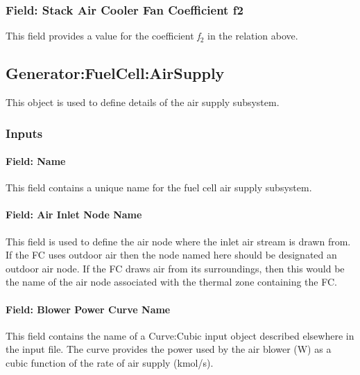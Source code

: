 \subsubsection{Field: Stack Air Cooler Fan Coefficient f2}\label{field-stack-air-cooler-fan-coefficient-f2}

This field provides a value for the coefficient \emph{f\(_{2}\)} in the relation above.

\subsection{Generator:FuelCell:AirSupply}\label{generatorfuelcellairsupply}

This object is used to define details of the air supply subsystem.

\subsubsection{Inputs}\label{inputs-14-003}

\paragraph{Field: Name}\label{field-name-16-001}

This field contains a unique name for the fuel cell air supply subsystem.

\paragraph{Field: Air Inlet Node Name}\label{field-air-inlet-node-name-1-000}

This field is used to define the air node where the inlet air stream is drawn from. If the FC uses outdoor air then the node named here should be designated an outdoor air node. If the FC draws air from its surroundings, then this would be the name of the air node associated with the thermal zone containing the FC.

\paragraph{Field: Blower Power Curve Name}\label{field-blower-power-curve-name}

This field contains the name of a Curve:Cubic input object described elsewhere in the input file. The curve provides the power used by the air blower (W) as a cubic function of the rate of air supply (kmol/s).

